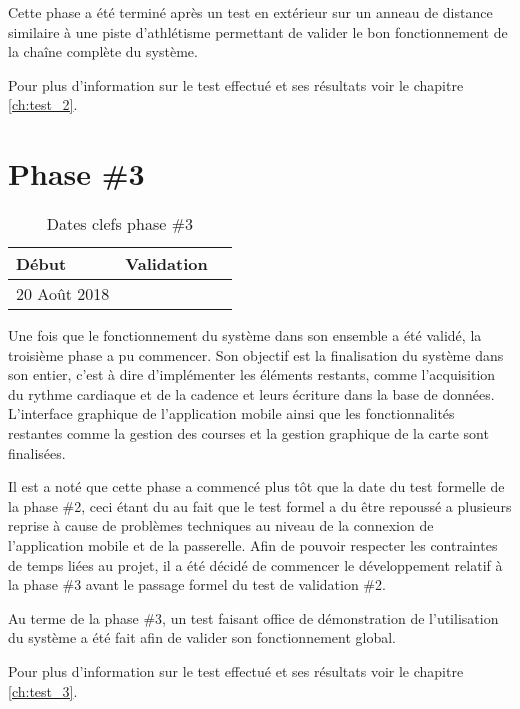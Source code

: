 Cette phase a été terminé après un test en extérieur sur un anneau de distance similaire à une piste d'athlétisme permettant de valider le bon fonctionnement de la chaîne complète du système.

Pour plus d'information sur le test effectué et ses résultats voir le chapitre \ref{ch:test_2}.

\section{Phase \#3}

\begin{table}[htb]
\caption{Dates clefs phase \#3}
\label{tab:detail_phase_3}
\centering
\begin{tabular}{ l l l }
\toprule
Début & Validation \\
\midrule
20 Août 2018 & \todo{}  \\
\bottomrule 
\end{tabular}
\end{table}

Une fois que le fonctionnement du système dans son ensemble a été validé, la troisième phase a pu commencer. Son objectif est la finalisation du système dans son entier, c'est à dire d'implémenter les éléments restants, comme l'acquisition du rythme cardiaque et de la cadence et leurs écriture dans la base de données. L'interface graphique de l'application mobile ainsi que les fonctionnalités restantes comme la gestion des courses et la gestion graphique de la carte sont finalisées.

Il est a noté que cette phase a commencé plus tôt que la date du test formelle de la phase \#2, ceci étant du au fait que le test formel a du être repoussé a plusieurs reprise à cause de problèmes techniques au niveau de la connexion de l'application mobile et de la passerelle. Afin de pouvoir respecter les contraintes de temps liées au projet, il a été décidé de commencer le développement relatif à la phase \#3 avant le passage formel du test de validation \#2.

Au terme de la phase \#3, un test faisant office de démonstration de l'utilisation du système a été fait afin de valider son fonctionnement global.

Pour plus d'information sur le test effectué et ses résultats voir le chapitre \ref{ch:test_3}.

